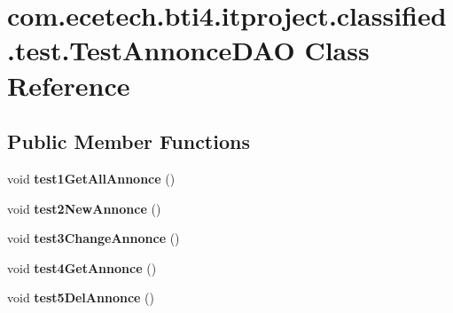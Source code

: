 \hypertarget{classcom_1_1ecetech_1_1bti4_1_1itproject_1_1classified_1_1test_1_1_test_annonce_d_a_o}{}\section{com.\+ecetech.\+bti4.\+itproject.\+classified.\+test.\+Test\+Annonce\+D\+AO Class Reference}
\label{classcom_1_1ecetech_1_1bti4_1_1itproject_1_1classified_1_1test_1_1_test_annonce_d_a_o}
\subsection*{Public Member Functions}
\begin{DoxyCompactItemize}
\item 
void {\bfseries test1\+Get\+All\+Annonce} ()\hypertarget{classcom_1_1ecetech_1_1bti4_1_1itproject_1_1classified_1_1test_1_1_test_annonce_d_a_o_a649838749c26daa9e73c5c4bd34a507e}{}\label{classcom_1_1ecetech_1_1bti4_1_1itproject_1_1classified_1_1test_1_1_test_annonce_d_a_o_a649838749c26daa9e73c5c4bd34a507e}

\item 
void {\bfseries test2\+New\+Annonce} ()\hypertarget{classcom_1_1ecetech_1_1bti4_1_1itproject_1_1classified_1_1test_1_1_test_annonce_d_a_o_a99ffe7e0de3f8ea8ff894cdeb52cd355}{}\label{classcom_1_1ecetech_1_1bti4_1_1itproject_1_1classified_1_1test_1_1_test_annonce_d_a_o_a99ffe7e0de3f8ea8ff894cdeb52cd355}

\item 
void {\bfseries test3\+Change\+Annonce} ()\hypertarget{classcom_1_1ecetech_1_1bti4_1_1itproject_1_1classified_1_1test_1_1_test_annonce_d_a_o_a3731d41225aecb113b30423418b44856}{}\label{classcom_1_1ecetech_1_1bti4_1_1itproject_1_1classified_1_1test_1_1_test_annonce_d_a_o_a3731d41225aecb113b30423418b44856}

\item 
void {\bfseries test4\+Get\+Annonce} ()\hypertarget{classcom_1_1ecetech_1_1bti4_1_1itproject_1_1classified_1_1test_1_1_test_annonce_d_a_o_ac5775f4c8a17a5382c9fa4f226a06bc4}{}\label{classcom_1_1ecetech_1_1bti4_1_1itproject_1_1classified_1_1test_1_1_test_annonce_d_a_o_ac5775f4c8a17a5382c9fa4f226a06bc4}

\item 
void {\bfseries test5\+Del\+Annonce} ()\hypertarget{classcom_1_1ecetech_1_1bti4_1_1itproject_1_1classified_1_1test_1_1_test_annonce_d_a_o_a2020ad246dec5776296d214f1b957e66}{}\label{classcom_1_1ecetech_1_1bti4_1_1itproject_1_1classified_1_1test_1_1_test_annonce_d_a_o_a2020ad246dec5776296d214f1b957e66}


\end{DoxyCompactItemize}
